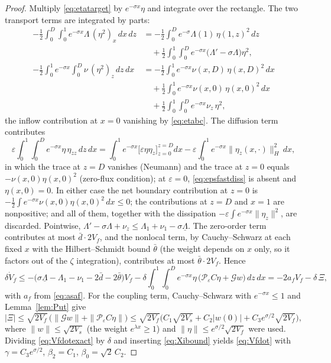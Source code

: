 \documentclass[12pt]{article}
\theoremstyle{plain}
\theoremstyle{remark}
\newcommand{\uL}{\underline\Lambda}
\newcommand{\PP}{\mathcal P}
\newcommand{\Hs}{H}
\begin{document}
\begin{proof}
Multiply \eqref{eq:etatarget} by $e^{-\sigma x}\eta$ and integrate over the rectangle. The two transport terms are integrated by parts:
\begin{align}
 -\frac12\int_0^D\!\int_0^1e^{-\sigma x}\Lambda\,(\eta^2)_x\,dx\,dz
 &=-\frac12\int_0^De^{-\sigma}\Lambda(1)\,\eta(1,z)^2\,dz
 \nonumber\\
 &\quad+\frac12\int_0^1\!\!\int_0^De^{-\sigma x}\big(\Lambda'-\sigma\Lambda\big)\eta^2,
 \label{eq:xIBP}\\
 -\frac12\int_0^1e^{-\sigma x}\!\int_0^D\nu\,(\eta^2)_z\,dz\,dx
 &=-\frac12\int_0^1e^{-\sigma x}\nu(x,D)\,\eta(x,D)^2\,dx
 \nonumber\\
 &\quad+\frac12\int_0^1e^{-\sigma x}\nu(x,0)\,\eta(x,0)^2\,dx
 \nonumber\\
 &\quad+\frac12\int_0^1\!\!\int_0^De^{-\sigma x}\nu_z\,\eta^2,
 \label{eq:zIBP}
\end{align}
the inflow contribution at $x=0$ vanishing by \eqref{eq:etabc}. The diffusion term contributes
\begin{equation}
 \varepsilon\int_0^1\!\!\int_0^De^{-\sigma x}\eta\,\eta_{zz}\,dz\,dx
 =\int_0^1e^{-\sigma x}\Big[\varepsilon\eta\eta_z\Big]_{z=0}^{z=D}dx
 -\varepsilon\int_0^1e^{-\sigma x}\|\eta_z(x,\cdot)\|_\Hs^2\,dx,
 \label{eq:epsfastdiss}
\end{equation}
in which the trace at $z=D$ vanishes (Neumann) and the trace at $z=0$ equals $-\nu(x,0)\eta(x,0)^2$ (zero-flux condition); at $\varepsilon=0$, \eqref{eq:epsfastdiss} is absent and $\eta(x,0)=0$. In either case the net boundary contribution at $z=0$ is $-\tfrac12\int e^{-\sigma x}\nu(x,0)\eta(x,0)^2\,dx\le0$; the contributions at $z=D$ and $x=1$ are nonpositive; and all of them, together with the dissipation $-\varepsilon\int e^{-\sigma x}\|\eta_z\|^2$, are discarded. Pointwise, $\Lambda'-\sigma\Lambda+\nu_z\le\Lambda_1+\nu_1-\sigma\uL$. The zero-order term contributes at most $\bar d\cdot2V_f$, and the nonlocal term, by Cauchy--Schwarz at each fixed $x$ with the Hilbert--Schmidt bound $\bar\theta$ (the weight depends on $x$ only, so it factors out of the $\zeta$ integration), contributes at most $\bar\theta\cdot2V_f$. Hence
\begin{equation}
 \delta\dot V_f
 \le-\big(\sigma\uL-\Lambda_1-\nu_1-2\bar d-2\bar\theta\big)V_f
 -\delta\int_0^1\!\!\int_0^De^{-\sigma x}\eta\,\big(\PP_\varepsilon C\eta+\mathcal Gw\big)\,dz\,dx
 =-2a_fV_f-\delta\,\Xi,
 \label{eq:Vfdotexact}
\end{equation}
with $a_f$ from \eqref{eq:asaf}. For the coupling term, Cauchy--Schwarz with $e^{-\sigma x}\le1$ and Lemma~\ref{lem:Put} give
\begin{equation}
 |\Xi|
 \le\sqrt{2V_f}\,\big(\|\mathcal Gw\|+\|\PP_\varepsilon C\eta\|\big)
 \le\sqrt{2V_f}\Big(C_1\sqrt{2V_s}+C_2|w(0)|+C_3e^{\sigma/2}\sqrt{2V_f}\Big),
 \label{eq:Xibound}
\end{equation}
where $\|w\|\le\sqrt{2V_s}$ (the weight $e^{\lambda x}\ge1$) and $\|\eta\|\le e^{\sigma/2}\sqrt{2V_f}$ were used. Dividing \eqref{eq:Vfdotexact} by $\delta$ and inserting \eqref{eq:Xibound} yields \eqref{eq:Vfdot} with $\gamma=C_3e^{\sigma/2}$, $\beta_2=C_1$, $\beta_0=\sqrt2\,C_2$.
\end{proof}
\end{document}
